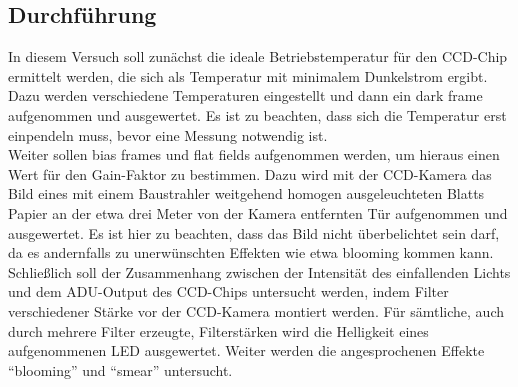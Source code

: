\subsection{Durchführung}
In diesem Versuch soll zunächst die ideale Betriebstemperatur für den CCD-Chip ermittelt werden, die sich als Temperatur mit minimalem Dunkelstrom ergibt. Dazu werden verschiedene Temperaturen eingestellt und dann ein dark frame aufgenommen und ausgewertet. Es ist zu beachten, dass sich die Temperatur erst einpendeln muss, bevor eine Messung notwendig ist. \\
Weiter sollen bias frames und flat fields aufgenommen werden, um hieraus einen Wert für den Gain-Faktor zu bestimmen. Dazu wird mit der CCD-Kamera das Bild eines mit einem Baustrahler weitgehend homogen ausgeleuchteten Blatts Papier an der etwa drei Meter von der Kamera entfernten Tür aufgenommen und ausgewertet. Es ist hier zu beachten, dass das Bild nicht überbelichtet sein darf, da es andernfalls zu unerwünschten Effekten wie etwa blooming kommen kann. \\
Schließlich soll der Zusammenhang zwischen der Intensität des einfallenden Lichts und dem ADU-Output des CCD-Chips untersucht werden, indem Filter verschiedener Stärke vor der CCD-Kamera montiert werden. Für sämtliche, auch durch mehrere Filter erzeugte, Filterstärken wird die Helligkeit eines aufgenommenen LED ausgewertet. Weiter werden die angesprochenen Effekte \enquote{blooming} und \enquote{smear} untersucht. 